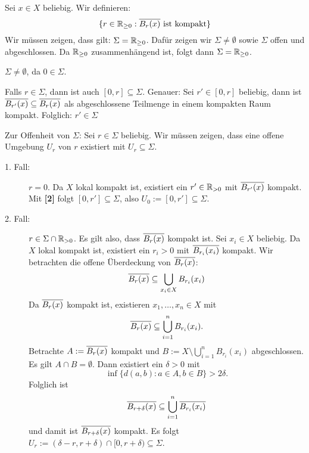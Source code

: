 \begin{beweis}[zu (i)]
		Sei $x \in X$ beliebig.
		Wir definieren:
		\[
			\{r \in \mathbb{R}_{\geq 0} : \overline{B_r(x)} \text{ ist kompakt} \}
		\]
		Wir müssen zeigen, dass gilt: $\Sigma = \mathbb{R}_{\geq 0}$.
		Dafür zeigen wir $\Sigma \neq \emptyset$ sowie $\Sigma$ offen und abgeschlossen.
		Da $\mathbb{R}_{\geq 0}$ zusammenhängend ist, folgt dann $\Sigma = \mathbb{R}_{\geq 0}$.
		\begin{enumerate}[{[1]}]
			\item $\Sigma \neq \emptyset$, da $0 \in \Sigma$.
			\item Falls $r \in \Sigma$, dann ist auch $[0,r] \subseteq \Sigma$.
			Genauer:
			Sei $r' \in [0,r]$ beliebig, dann ist $\overline{B_{r'}(x)} \subseteq \overline{B_r(x)}$ als abgeschlossene Teilmenge in einem kompakten Raum kompakt.
			Folglich: $r' \in \Sigma$
		\end{enumerate}
		
		Zur Offenheit von $\Sigma$:
		Sei $r \in \Sigma$ beliebig.
		Wir müssen zeigen, dass eine offene Umgebung $U_r$ von $r$ existiert mit $U_r \subseteq \Sigma$.
		\begin{description}
			\item[1. Fall:]  $r = 0$.
			Da $X$ lokal kompakt ist, existiert ein $r' \in \mathbb{R}_{>0}$ mit $\overline{B_{r'}(x)}$ kompakt.
			Mit \textbf{[2]} folgt $[0,r'] \subseteq \Sigma$, also $U_0 := [0,r'] \subseteq \Sigma$.
			\item[2. Fall:] $r \in \Sigma \cap \mathbb{R}_{>0}$.
			Es gilt also, dass $\overline{B_r(x)}$ kompakt ist.
			Sei $x_i \in X$ beliebig.
			Da $X$ lokal kompakt ist, existiert ein $r_i > 0$ mit $\overline{B_{r_i}(x_i)}$ kompakt.
			Wir betrachten die offene Überdeckung von $\overline{B_r(x)}$:
			\[
				\overline{B_r(x)} \subseteq \bigcup_{x_i \in X} B_{r_i}(x_i)
			\]
			Da $\overline{B_r(x)}$ kompakt ist, existieren $x_1,\dots,x_n \in X$ mit
			\[
				\overline{B_r(x)} \subseteq \bigcup_{i=1}^n B_{r_i}(x_i).
			\]
			Betrachte $A := \overline{B_r(x)}$ kompakt und $B := X \setminus \bigcup_{i=1}^n B_{r_i}(x_i)$ abgeschlossen.
			Es gilt $A \cap B = \emptyset$. Dann existiert ein $\delta >0$ mit
			\begin{equation}
				\inf\{ d(a,b) : a\in A, b \in B\} > 2 \delta. \label{eq:2.13.!}
			\end{equation}
			Folglich ist
			\[
				\overline{B_{r+\delta}(x)} \subseteq \bigcup_{i=1}^n \overline{B_{r_i}(x_i)}
			\]
			und damit ist $\overline{B_{r+\delta}(x)}$ kompakt.
			Es folgt $U_r := (\delta-r,r+\delta) \cap [0,r+\delta) \subseteq \Sigma$.
			

\end{description}
\end{beweis}
